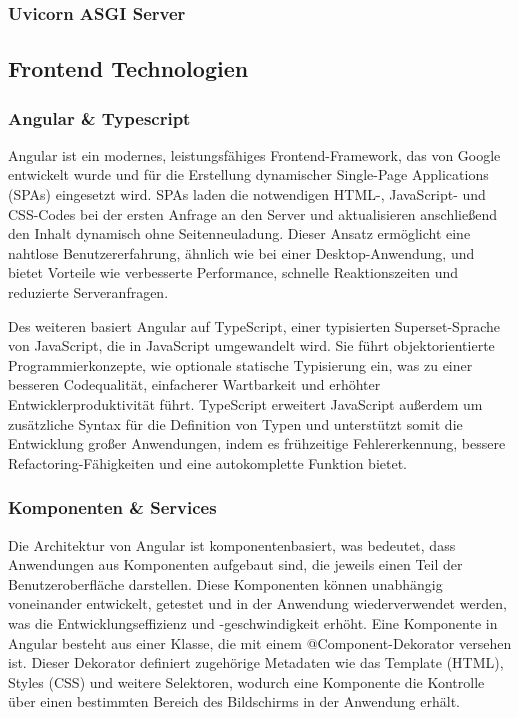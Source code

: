 \documentclass[../main.tex]{subfiles} %
\begin{document}
\subsubsection{Uvicorn ASGI Server}

\subsection{Frontend Technologien} %

\subsubsection{Angular & Typescript}

Angular ist ein modernes, leistungsfähiges Frontend-Framework, das von Google entwickelt wurde und für die Erstellung dynamischer Single-Page 
Applications (SPAs) eingesetzt wird. SPAs laden die notwendigen HTML-, JavaScript- und CSS-Codes bei der ersten Anfrage an den Server und 
aktualisieren anschließend den Inhalt dynamisch ohne Seitenneuladung. Dieser Ansatz ermöglicht eine nahtlose Benutzererfahrung, ähnlich wie bei 
einer Desktop-Anwendung, und bietet Vorteile wie verbesserte Performance, schnelle Reaktionszeiten und reduzierte Serveranfragen.

Des weiteren basiert Angular auf TypeScript, einer typisierten Superset-Sprache von JavaScript, die in JavaScript umgewandelt wird. Sie führt 
objektorientierte Programmierkonzepte, wie optionale statische Typisierung ein, was zu einer besseren Codequalität, einfacherer Wartbarkeit und 
erhöhter Entwicklerproduktivität führt. TypeScript erweitert JavaScript außerdem um zusätzliche Syntax für die Definition von Typen und unterstützt 
somit die Entwicklung großer Anwendungen, indem es frühzeitige Fehlererkennung, bessere Refactoring-Fähigkeiten und eine autokomplette Funktion bietet.

\subsubsection{Komponenten \& Services}

Die Architektur von Angular ist komponentenbasiert, was bedeutet, dass Anwendungen aus Komponenten aufgebaut sind, die
jeweils einen Teil der Benutzeroberfläche darstellen. Diese Komponenten können unabhängig voneinander entwickelt, getestet und in der
Anwendung wiederverwendet werden, was die Entwicklungseffizienz und -geschwindigkeit erhöht. Eine Komponente in Angular besteht aus einer 
Klasse, die mit einem @Component-Dekorator versehen ist. Dieser Dekorator definiert zugehörige Metadaten wie das Template (HTML), Styles (CSS) 
und weitere Selektoren, wodurch eine Komponente die Kontrolle über einen bestimmten Bereich des Bildschirms in der Anwendung erhält.
\end{document}
